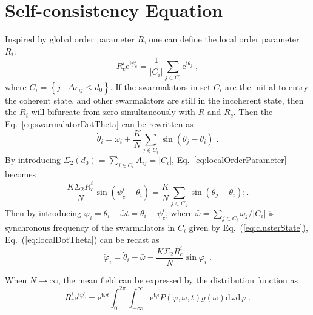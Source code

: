 \documentclass{article}
\begin{document}
\newpage
\section{Self-consistency Equation}

Inspired by global order parameter $R$, one can define the local order parameter $R_i$:
\begin{equation}
    \label{eq:localOrderParameter}
    R_{c}^{i}\mathrm{e}^{\mathrm{i}\psi _{c}^{i}}=\frac{1}{\left| C_i \right|}\sum_{j\in C_i}{\mathrm{e}^{\mathrm{i}\theta _j}}\;,
\end{equation}
where $C_i=\left\{ j\mid \Delta r_{ij}\le d_0 \right\}$. If the swarmalators in set $C_i$ are the initial to entry the coherent state, and other swarmalators are still in the incoherent state, then the $R_i$ will bifurcate from zero simultaneously with $R$ and $R_c$. Then the Eq.~\eqref{eq:swarmalatorDotTheta} can be rewritten as
\begin{equation}
    \label{eq:localDotTheta}
    \dot{\theta}_i=\omega _i+\frac{K}{N} \sum_{j\in C_i}{\sin \left( \theta _j-\theta _i \right)}\;.
\end{equation}
By introducing $\Sigma _2\left( d_0 \right) =\sum\nolimits_{j\in C_i}^{}{A_{ij}}=\left|C_i\right|$, Eq.~\eqref{eq:localOrderParameter} becomes 
\begin{equation}
    \frac{K\Sigma _2R_{c}^{i}}{N} \sin \left( \psi _{c}^{i}-\theta _i \right) =\frac{K}{N} \sum_{j\in C_k}{\sin \left( \theta _j-\theta _i \right)}
;.
\end{equation}
Then by introducing $\varphi _i=\theta _i-\bar{\omega}t=\theta_i-\psi _{c}^{i}$, where $\bar{\omega}=\sum_{j\in C_i}{\omega _j}/\left| C_i \right|$ is synchronous frequency of the swarmalators in $C_i$ given by Eq.~(\ref{eq:clusterState}), Eq.~(\ref{eq:localDotTheta}) can be recast as
\begin{equation}
    \label{eq:dotphi}
    \dot{\varphi}_i=\dot{\theta}_i-\bar{\omega}-\frac{K\Sigma _2R_{c}^{i}}{N} \sin \varphi _i\;.
\end{equation}

When $N\rightarrow \infty$, the mean field can be expressed by the distribution function as
\begin{equation}
    R_{c}^{i}\mathrm{e}^{\mathrm{i}\psi _{c}^{i}}=\mathrm{e}^{\mathrm{i}\bar{\omega}t}\int_0^{2\pi}{\int_{-\infty}^{\infty}{\mathrm{e}^{\mathrm{i}\varphi}}}P(\varphi ,\omega ,t)g(\omega )\mathrm{d}\omega \mathrm{d}\varphi\;.
\end{equation}
\end{document}
